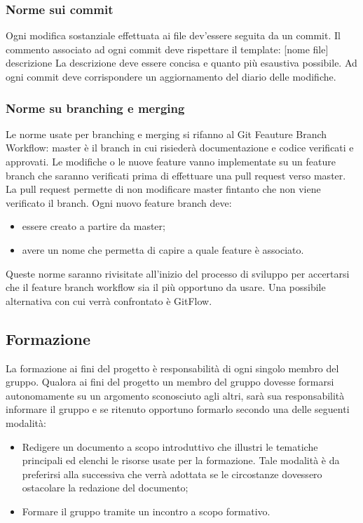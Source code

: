 \subsubsection{Norme sui commit}
Ogni modifica sostanziale effettuata ai file dev'essere seguita da un commit. Il commento associato ad ogni commit deve rispettare il template: [nome file] descrizione
La descrizione deve essere concisa e quanto più esaustiva possibile. Ad ogni commit deve corrispondere un aggiornamento del diario delle modifiche. 

\subsubsection{Norme su branching e merging}
Le norme usate per branching e merging si rifanno al Git Feauture Branch Workflow:
master è il branch in cui risiederà documentazione e codice verificati e approvati.
Le modifiche o le nuove feature vanno implementate su un feature branch che saranno verificati
prima di effettuare una pull request verso master.
La pull request permette di non modificare master fintanto che non viene verificato il branch.
Ogni nuovo feature branch deve:
\begin{itemize}  
\item essere creato a partire da master;
\item avere un nome che permetta di capire a quale feature è associato.
\end{itemize}
Queste norme saranno rivisitate all'inizio del processo di sviluppo per accertarsi che il feature branch workflow
sia il più opportuno da usare. Una possibile alternativa con cui verrà confrontato è GitFlow.

\subsection{Formazione}
La formazione ai fini del progetto è responsabilità di ogni singolo membro del gruppo. Qualora ai fini del progetto un membro del gruppo dovesse formarsi autonomamente su un argomento sconosciuto agli altri, sarà sua responsabilità informare il gruppo e se ritenuto opportuno formarlo secondo una delle seguenti modalità: 
\begin{itemize}  
\item Redigere un documento a scopo introduttivo che illustri le tematiche principali ed 
elenchi le risorse usate per la formazione. Tale modalità è da preferirsi alla successiva che verrà adottata se le circostanze dovessero ostacolare la redazione del documento;
\item Formare il gruppo tramite un incontro a scopo formativo.
\end{itemize}
\pagebreak